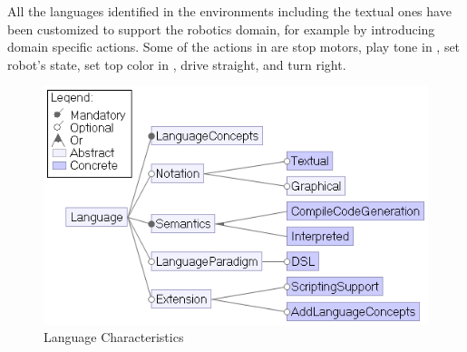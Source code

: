 All the languages identified in the environments including the textual ones have been customized to support the robotics domain, for example by introducing domain specific actions. Some of the actions in \lego are stop motors, play tone in \trik, set robot's state, set top color in \aseba,  drive straight, and turn right. %

\begin{figure}[t]
     \centering
    \includegraphics[width=\columnwidth]{Languagefeatures.png}
      \caption{Language Characteristics}
      \label{fig:languagefeatures}
   \end{figure}

